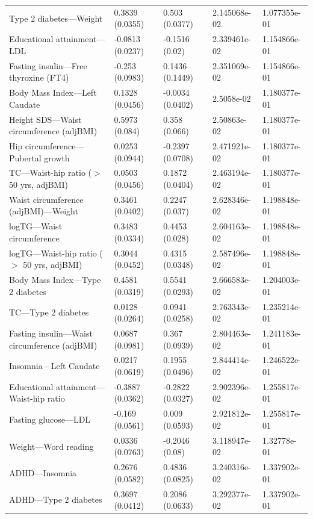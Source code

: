 \documentclass{article}\usepackage[]{graphicx}\usepackage[dvipsnames]{xcolor}
\begin{document}
\begin{longtable}{p{6cm}|p{1.5cm}|p{1.5cm}|p{1.5cm}}
  Type 2 diabetes---Weight & 0.3839 (0.0355) & 0.503 (0.0377) & 2.145068e-02 & 1.077355e-01 \\ 
  Educational attainment---LDL & -0.0813 (0.0237) & -0.1516 (0.02) & 2.339461e-02 & 1.154866e-01 \\ 
  Fasting insulin---Free thyroxine (FT4) & -0.253 (0.0983) & 0.1436 (0.1449) & 2.351069e-02 & 1.154866e-01 \\ 
  Body Mass Index---Left Caudate & 0.1328 (0.0456) & -0.0034 (0.0402) & 2.5058e-02 & 1.180377e-01 \\ 
  Height SDS---Waist circumference (adjBMI) & 0.5973 (0.084) & 0.358 (0.066) & 2.50863e-02 & 1.180377e-01 \\ 
  Hip circumference---Pubertal growth & 0.0253 (0.0944) & -0.2397 (0.0708) & 2.471921e-02 & 1.180377e-01 \\ 
  TC---Waist-hip ratio ($>$ 50 yrs, adjBMI) & 0.0503 (0.0456) & 0.1872 (0.0404) & 2.463194e-02 & 1.180377e-01 \\ 
  Waist circumference (adjBMI)---Weight & 0.3461 (0.0402) & 0.2247 (0.037) & 2.628346e-02 & 1.198848e-01 \\ 
  logTG---Waist circumference & 0.3483 (0.0334) & 0.4453 (0.028) & 2.604163e-02 & 1.198848e-01 \\ 
  logTG---Waist-hip ratio ($>$ 50 yrs, adjBMI) & 0.3044 (0.0452) & 0.4315 (0.0348) & 2.587496e-02 & 1.198848e-01 \\ 
  Body Mass Index---Type 2 diabetes & 0.4581 (0.0319) & 0.5541 (0.0293) & 2.666583e-02 & 1.204003e-01 \\ 
  TC---Type 2 diabetes & 0.0128 (0.0264) & 0.0941 (0.0258) & 2.763343e-02 & 1.235214e-01 \\ 
  Fasting insulin---Waist circumference (adjBMI) & 0.0687 (0.0981) & 0.367 (0.0939) & 2.804463e-02 & 1.241183e-01 \\ 
  Insomnia---Left Caudate & 0.0217 (0.0619) & 0.1955 (0.0496) & 2.844414e-02 & 1.246522e-01 \\ 
  Educational attainment---Waist-hip ratio & -0.3887 (0.0362) & -0.2822 (0.0327) & 2.902396e-02 & 1.255817e-01 \\ 
  Fasting glucose---LDL & -0.169 (0.0561) & 0.009 (0.0593) & 2.921812e-02 & 1.255817e-01 \\ 
  Weight---Word reading & 0.0336 (0.0763) & -0.2046 (0.08) & 3.118947e-02 & 1.32778e-01 \\ 
  ADHD---Insomnia & 0.2676 (0.0582) & 0.4836 (0.0825) & 3.240316e-02 & 1.337902e-01 \\ 
  ADHD---Type 2 diabetes & 0.3697 (0.0412) & 0.2086 (0.0633) & 3.292377e-02 & 1.337902e-01 \\ 

\end{longtable}
\end{document}
